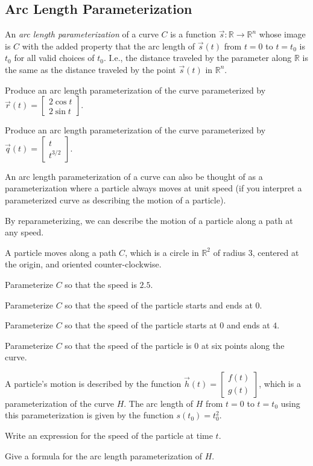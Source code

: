 \documentclass{problemset}
\newcommand{\R}{\mathbb{R}}
\newcommand{\mat}[1]{\begin{bmatrix}#1\end{bmatrix}}
\begin{document}
\subsection*{Arc Length Parameterization}
	
	An \emph{arc length parameterization} of a curve $C$ is a function $\vec s:\R\to\R^n$ whose
	image is $C$ with the added property that the arc length of $\vec s(t)$ from $t=0$ to $t=t_0$
	is $t_0$ for all valid choices of $t_0$.  I.e., the distance traveled by the parameter along
	$\R$ is the same as the distance traveled by the point $\vec s(t)$ in $\R^n$.

	\question
	\begin{parts}
		\item Produce an arc length parameterization of the curve parameterized by
			$
				\vec r(t) =\mat{2\cos t\\ 2\sin t}.
			$
		\item Produce an arc length parameterization of the curve parameterized by
			$
				\vec q(t) =\mat{t\\ t^{3/2}}.
			$
	\end{parts}

	
	An arc length parameterization of a curve can also be thought of
	as a parameterization where a particle always moves at unit speed 
	(if you interpret a parameterized curve as describing the motion of a
	particle).

	By reparameterizing, we can describe the motion of a particle along
	a path at any speed.

	\question
	A particle moves along a path $C$, which is a circle in $\R^2$ of radius $3$, centered at the origin, and oriented counter-clockwise.
	\begin{parts}
		\item Parameterize $C$ so that the speed is $2.5$.
		\item Parameterize $C$ so that the speed of the particle starts and ends at $0$.
		\item Parameterize $C$ so that the speed of the particle starts at $0$ and ends at $4$.
		\item Parameterize $C$ so that the speed of the particle is $0$ at six points along the curve.
	\end{parts}

	\question
	A particle's motion is described by the function $\vec h(t) = \mat{f(t)\\ g(t)}$,  which is a 
	parameterization of the curve $H$.  The arc length of $H$ from $t=0$ to
	$t=t_0$ using this parameterization is given by the function $s(t_0) = t_0^2$.
	\begin{parts}
		\item Write an expression for the speed of the particle at time $t$.
		\item Give a formula for the arc length parameterization of $H$.
	\end{parts}
\end{document}
